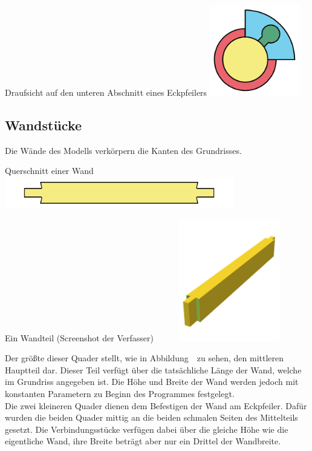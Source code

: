 \begin{Bild}{Draufsicht auf den unteren Abschnitt eines Eckpfeilers}
	\includegraphics[height=150px]{Bilder/CornerPin2D-07.png}
\end{Bild}
\subsection{Wandstücke}
Die Wände des Modells verkörpern die Kanten des Grundrisses.

\begin{Bild}{Querschnitt einer Wand}
	\includegraphics[width = 100mm]{Bilder/Wand2D-04}
\end{Bild}
\begin{Bild}{Ein Wandteil (Screenshot der Verfasser)}
	\includegraphics[height=200px, width=240px]{Bilder/Untereinheit_Wand}
\end{Bild}
Der größte dieser Quader stellt, wie in Abbildung~\thebildnr\ zu sehen, den mittleren Hauptteil dar.
Dieser Teil verfügt über die tatsächliche Länge der Wand, welche im Grundriss angegeben ist.
Die Höhe und Breite der Wand werden jedoch mit konstanten Parametern zu Beginn des Programmes festgelegt. \\
Die zwei kleineren Quader dienen dem Befestigen der Wand am Eckpfeiler.
Dafür wurden die beiden Quader mittig an die beiden schmalen Seiten des Mittelteils gesetzt.
Die Verbindungsstücke verfügen dabei über die gleiche Höhe wie die eigentliche Wand, ihre Breite beträgt aber nur ein Drittel der Wandbreite.\\



